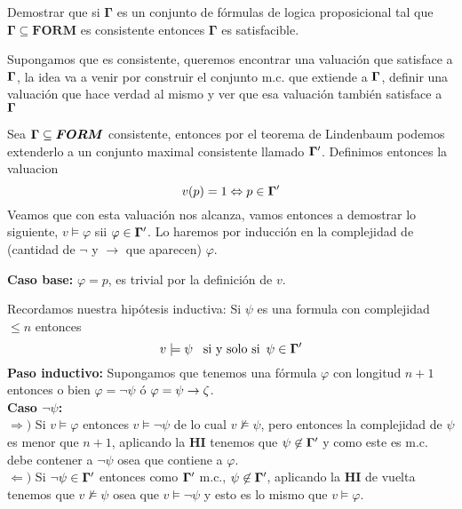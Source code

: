 \documentclass[leqno, 12pt, twoside,letterpaper]{book}
\begin{document}
\begin{ej}{3}
    Demostrar que si $\bm{\Gamma}$ es un conjunto de fórmulas de logica proposicional
    tal que $\bm{\Gamma \subseteq FORM}$ es consistente entonces $\bm{\Gamma}$ es
    satisfacible.
\end{ej}

\begin{solucion}
Supongamos que es consistente, queremos encontrar una valuación que satisface a $\bm{\Gamma}$, la idea va a venir por construir el conjunto m.c. que extiende a $\bm{\Gamma}$, definir una valuación que hace verdad al mismo y ver que esa valuación también satisface a $\bm{\Gamma}$ \\

\begin{dem}
Sea $\bm{\Gamma} \subseteq \bm{FORM}$ consistente, entonces por el teorema de Lindenbaum podemos extenderlo a un
 conjunto maximal consistente llamado $\bm{\Gamma}'$. Definimos entonces la valuacion
  \[ v(p) = 1  \Leftrightarrow p \in \bm{\Gamma}' \]
Veamos que con esta valuación nos alcanza, vamos entonces a demostrar lo siguiente, $v \models \varphi$ sii $\varphi \in \bm{\Gamma}'$. Lo haremos por inducción en la complejidad de (cantidad de $\lnot$ y $\rightarrow$ que aparecen) $\varphi$.

\noindent \textbf{Caso base:} $\varphi = p$, es trivial por la definición de $v$.

\noindent Recordamos nuestra hipótesis inductiva: Si $\psi$ es una formula con complejidad $\leq n$ entonces \[ v \models \psi \mbox{ \, si y solo si \,} \psi \in \bm{\Gamma}' \]
\textbf{Paso inductivo:} Supongamos que tenemos una fórmula $\varphi$ con longitud $n + 1$ entonces o bien
$\varphi = \lnot \psi$ ó $\varphi = \psi \rightarrow \zeta$.\\

\noindent \textbf{Caso $\lnot \psi$:} \\
\noindent $\Rightarrow)$ Si $v \models \varphi$ entonces $v \models \lnot\psi$ de lo cual $v \not\models \psi$, pero entonces la complejidad de $\psi$ es menor que $n + 1$, aplicando la \textbf{HI} tenemos que $\psi \not\in \bm{\Gamma}'$ y como este es m.c. debe contener a $\lnot\psi$ osea que contiene a $\varphi$. \\
\noindent $\Leftarrow)$ Si $\lnot\psi \in \bm{\Gamma}'$ entonces como $\bm{\Gamma}'$ m.c., $\psi \not\in \bm{\Gamma}'$, aplicando la \textbf{HI} de vuelta tenemos que $v \not\models \psi$ osea que $v \models \lnot \psi$ y esto es lo mismo que $v \models \varphi$. \\


\end{dem}
\end{solucion}
\end{document}
